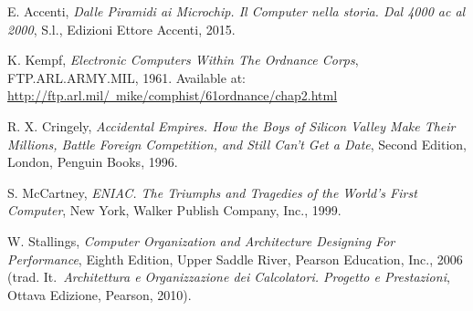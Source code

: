 \nocite{*}
\renewcommand{\refname}{Bibliografia}
\begin{thebibliography}{00}
	E. Accenti, \emph{Dalle Piramidi ai Microchip. Il Computer nella storia. Dal 4000 ac al 2000}, S.l., Edizioni Ettore Accenti, 2015.

	K. Kempf, \emph{Electronic Computers Within The Ordnance Corps}, FTP.ARL.ARMY.MIL, 1961. Available at: \href{http://ftp.arl.mil/~mike/comphist/61ordnance/chap2.html}{http://ftp.arl.mil/~mike/comphist/61ordnance/chap2.html}

	R. X. Cringely, \emph{Accidental Empires. How the Boys of Silicon Valley Make Their Millions, Battle Foreign Competition, and Still Can't Get a Date}, Second Edition, London, Penguin Books, 1996.

	S. McCartney, \emph{ENIAC\@. The Triumphs and Tragedies of the World's First Computer}, New York, Walker Publish Company, Inc., 1999.

	W. Stallings, \emph{Computer Organization and Architecture Designing For Performance}, Eighth Edition, Upper Saddle River, Pearson Education, Inc., 2006 (trad. It.\ \emph{Architettura e Organizzazione dei Calcolatori. Progetto e Prestazioni}, Ottava Edizione, Pearson, 2010).

\end{thebibliography}